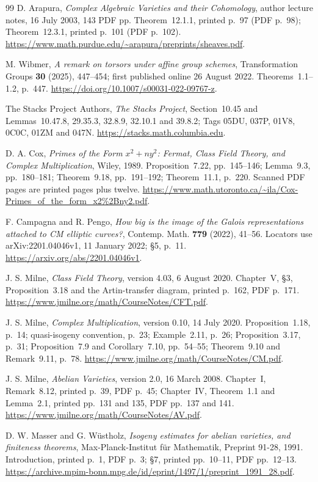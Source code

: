 \documentclass[11pt]{article}
\theoremstyle{definition}\newtheorem{definition}[theorem]{Definition}
\theoremstyle{remark}\newtheorem{remark}[theorem]{Remark}
\begin{document}
\begin{thebibliography}{99}
 D. Arapura, \emph{Complex Algebraic Varieties and their Cohomology}, author lecture notes, 16 July 2003, 143 PDF pp. Theorem~12.1.1, printed p.~97 (PDF p.~98); Theorem~12.3.1, printed p.~101 (PDF p.~102). \url{https://www.math.purdue.edu/~arapura/preprints/sheaves.pdf}.

 M. Wibmer, \emph{A remark on torsors under affine group schemes}, Transformation Groups \textbf{30} (2025), 447--454; first published online 26 August 2022. Theorems~1.1--1.2, p.~447. \url{https://doi.org/10.1007/s00031-022-09767-z}.

 The Stacks Project Authors, \emph{The Stacks Project}, Section~10.45 and Lemmas~10.47.8, 29.35.3, 32.8.9, 32.10.1 and 39.8.2; Tags 05DU, 037P, 01V8, 0C0C, 01ZM and 047N. \url{https://stacks.math.columbia.edu}.

 D. A. Cox, \emph{Primes of the Form $x^2+ny^2$: Fermat, Class Field Theory, and Complex Multiplication}, Wiley, 1989. Proposition~7.22, pp.~145--146; Lemma~9.3, pp.~180--181; Theorem~9.18, pp.~191--192; Theorem~11.1, p.~220. Scanned PDF pages are printed pages plus twelve. \url{https://www.math.utoronto.ca/~ila/Cox-Primes_of_the_form_x2%2Bny2.pdf}.

 F. Campagna and R. Pengo, \emph{How big is the image of the Galois representations attached to CM elliptic curves?}, Contemp. Math. \textbf{779} (2022), 41--56. Locators use arXiv:2201.04046v1, 11 January 2022; \S5, p.~11. \url{https://arxiv.org/abs/2201.04046v1}.

 J. S. Milne, \emph{Class Field Theory}, version 4.03, 6 August 2020. Chapter~V, \S3, Proposition~3.18 and the Artin-transfer diagram, printed p.~162, PDF p.~171. \url{https://www.jmilne.org/math/CourseNotes/CFT.pdf}.

 J. S. Milne, \emph{Complex Multiplication}, version 0.10, 14 July 2020. Proposition~1.18, p.~14; quasi-isogeny convention, p.~23; Example~2.11, p.~26; Proposition~3.17, p.~31; Proposition~7.9 and Corollary~7.10, pp.~54--55; Theorem~9.10 and Remark~9.11, p.~78. \url{https://www.jmilne.org/math/CourseNotes/CM.pdf}.

 J. S. Milne, \emph{Abelian Varieties}, version 2.0, 16 March 2008. Chapter~I, Remark~8.12, printed p.~39, PDF p.~45; Chapter~IV, Theorem~1.1 and Lemma~2.1, printed pp.~131 and 135, PDF pp.~137 and 141. \url{https://www.jmilne.org/math/CourseNotes/AV.pdf}.

 D. W. Masser and G. W\"ustholz, \emph{Isogeny estimates for abelian varieties, and finiteness theorems}, Max-Planck-Institut f\"ur Mathematik, Preprint 91-28, 1991. Introduction, printed p.~1, PDF p.~3; \S7, printed pp.~10--11, PDF pp.~12--13. \url{https://archive.mpim-bonn.mpg.de/id/eprint/1497/1/preprint_1991_28.pdf}.

\end{thebibliography}
\end{document}
